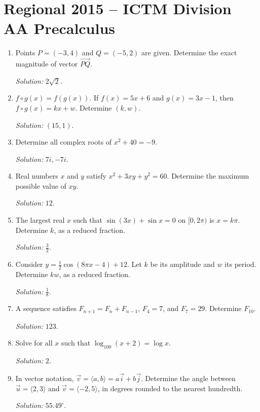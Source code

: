 \documentclass[11pt]{article}
\begin{document}
\section*{Regional 2015 -- ICTM Division AA Precalculus}
\begin{enumerate}[label=\textbf{\arabic*.}]
\item Points $P=(-3,4)$ and $Q=(-5,2)$ are given. Determine the exact magnitude of vector $\overrightarrow{PQ}$.\par\textit{Solution: }$2\sqrt2$.

\item $f\circ g(x)=f(g(x))$. If $f(x)=5x+6$ and $g(x)=3x-1$, then $f\circ g(x)=kx+w$. Determine $(k,w)$.\par\textit{Solution: }$(15,1)$.

\item Determine all complex roots of $x^2+40=-9$.\par\textit{Solution: }$7i,-7i$.

\item Real numbers $x$ and $y$ satisfy $x^2+3xy+y^2=60$. Determine the maximum possible value of $xy$.\par\textit{Solution: }$12$.

\item The largest real $x$ such that $\sin(3x)+\sin x=0$ on $[0,2\pi)$ is $x=k\pi$. Determine $k$, as a reduced fraction.\par\textit{Solution: }$\frac32$.

\item Consider $y=\frac12\cos(8\pi x-4)+12$. Let $k$ be its amplitude and $w$ its period. Determine $kw$, as a reduced fraction.\par\textit{Solution: }$\frac18$.

\item A sequence satisfies $F_{n+1}=F_n+F_{n-1}$, $F_4=7$, and $F_7=29$. Determine $F_{10}$.\par\textit{Solution: }$123$.

\item Solve for all $x$ such that $\log_{100}(x+2)=\log x$.\par\textit{Solution: }$2$.

\item In vector notation, $\vec v=\langle a,b\rangle=a\vec i+b\vec j$. Determine the angle between $\vec u=\langle2,3\rangle$ and $\vec v=\langle-2,5\rangle$, in degrees rounded to the nearest hundredth.\par\textit{Solution: }$55.49^\circ$.


\end{enumerate}
\end{document}

